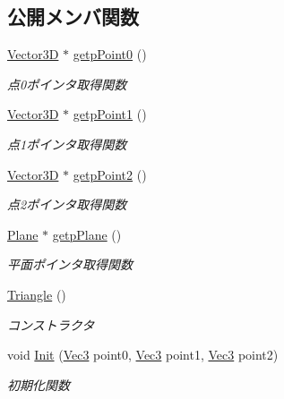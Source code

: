 \subsection*{公開メンバ関数}
\begin{DoxyCompactItemize}
\item 
\mbox{\hyperlink{class_vector3_d}{Vector3D}} $\ast$ \mbox{\hyperlink{class_triangle_a7fa9f7bdcffefa718b80cc9171575341}{getp\+Point0}} ()
\begin{DoxyCompactList}\small\item\em 点0ポインタ取得関数 \end{DoxyCompactList}\item 
\mbox{\hyperlink{class_vector3_d}{Vector3D}} $\ast$ \mbox{\hyperlink{class_triangle_aa97b6da9dfc28c1eea93bb5538004794}{getp\+Point1}} ()
\begin{DoxyCompactList}\small\item\em 点1ポインタ取得関数 \end{DoxyCompactList}\item 
\mbox{\hyperlink{class_vector3_d}{Vector3D}} $\ast$ \mbox{\hyperlink{class_triangle_a99a2a556b7c1cba1c5e777cebbb843d4}{getp\+Point2}} ()
\begin{DoxyCompactList}\small\item\em 点2ポインタ取得関数 \end{DoxyCompactList}\item 
\mbox{\hyperlink{class_plane}{Plane}} $\ast$ \mbox{\hyperlink{class_triangle_a4d0713aa2052d4b6cbde72202bcaca20}{getp\+Plane}} ()
\begin{DoxyCompactList}\small\item\em 平面ポインタ取得関数 \end{DoxyCompactList}\item 
\mbox{\hyperlink{class_triangle_aaefe4ed500c07918d30c6f0e286332c5}{Triangle}} ()
\begin{DoxyCompactList}\small\item\em コンストラクタ \end{DoxyCompactList}\item 
void \mbox{\hyperlink{class_triangle_a291c8c4aeeb85e4561e4fd162816f5da}{Init}} (\mbox{\hyperlink{_vector3_d_8h_ab16f59e4393f29a01ec8b9bbbabbe65d}{Vec3}} point0, \mbox{\hyperlink{_vector3_d_8h_ab16f59e4393f29a01ec8b9bbbabbe65d}{Vec3}} point1, \mbox{\hyperlink{_vector3_d_8h_ab16f59e4393f29a01ec8b9bbbabbe65d}{Vec3}} point2)
\begin{DoxyCompactList}\small\item\em 初期化関数 \end{DoxyCompactList}\end{DoxyCompactItemize}
